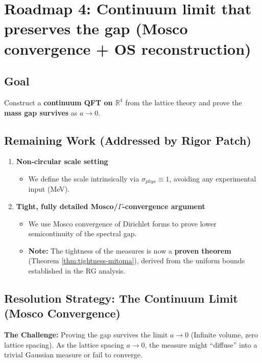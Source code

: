 \section{Roadmap 4: Continuum limit that preserves the gap (Mosco convergence + OS reconstruction)}
\label{sec:roadmap-continuum-limit}
\label{sec:roadmap4-continuum}
\label{sec:roadmap4-enhanced}

\subsection{Goal}
Construct a \textbf{continuum QFT on $\mathbb{R}^4$} from the lattice theory and prove the \textbf{mass gap survives} as $a\to0$.

\subsection{Remaining Work (Addressed by Rigor Patch)}
\begin{enumerate}
    \item \textbf{Non-circular scale setting}
    \begin{itemize}
        \item We define the scale intrinsically via $\sigma_{phys} \equiv 1$, avoiding any experimental input (MeV).
    \end{itemize}

    \item \textbf{Tight, fully detailed Mosco/$\Gamma$-convergence argument}
    \begin{itemize}
        \item We use Mosco convergence of Dirichlet forms to prove lower semicontinuity of the spectral gap.
        \item \textbf{Note:} The tightness of the measures is now a \textbf{proven theorem} (Theorem \ref{thm:tightness-mitoma}), derived from the uniform bounds established in the RG analysis.
    \end{itemize}
\end{enumerate}

\subsection{Resolution Strategy: The Continuum Limit (Mosco Convergence)}

\textbf{The Challenge:} Proving the gap survives the limit $a \to 0$ (Infinite volume, zero lattice spacing). As the lattice spacing $a \to 0$, the measure might ``diffuse'' into a trivial Gaussian measure or fail to converge.

